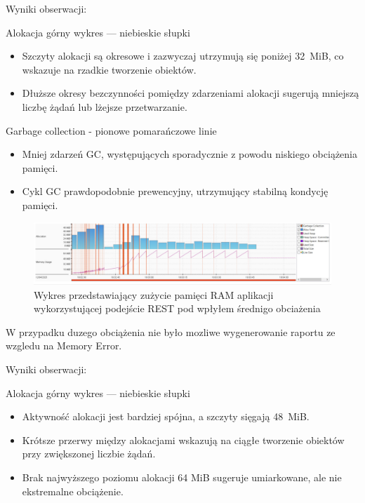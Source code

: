 \documentclass[runningheads,12pt]{llncs}
\begin{document}
Wyniki obserwacji:

Alokacja górny wykres — niebieskie słupki

\begin{itemize}
  \item Szczyty alokacji są okresowe i zazwyczaj utrzymują się poniżej 32~MiB, co wskazuje na rzadkie tworzenie obiektów.
  \item Dłuższe okresy bezczynności pomiędzy zdarzeniami alokacji sugerują mniejszą liczbę żądań lub lżejsze przetwarzanie.
\end{itemize}

Garbage collection - pionowe pomarańczowe linie

\begin{itemize}
  \item Mniej zdarzeń GC, występujących sporadycznie z powodu niskiego obciążenia pamięci.
  \item Cykl GC prawdopodobnie prewencyjny, utrzymujący stabilną kondycję pamięci.
\end{itemize}

\newpage

\begin{figure}
    \includegraphics[width=\linewidth]{images/rest-memory-middle-graph.jpg}
    \caption{Wykres przedstawiający zużycie pamięci RAM aplikacji wykorzystującej podejście REST pod wpłyłem średnigo obciażenia} \label{fig1}
\end{figure}

W przypadku duzego obciążenia nie było mozliwe wygenerowanie raportu ze wzgledu na Memory Error.

Wyniki obserwacji:

Alokacja górny wykres — niebieskie słupki

\begin{itemize}
  \item Aktywność alokacji jest bardziej spójna, a szczyty sięgają 48~MiB.
  \item Krótsze przerwy między alokacjami wskazują na ciągłe tworzenie obiektów przy zwiększonej liczbie żądań.
  \item Brak najwyższego poziomu alokacji 64 MiB sugeruje umiarkowane, ale nie ekstremalne obciążenie.
\end{itemize}
\end{document}
